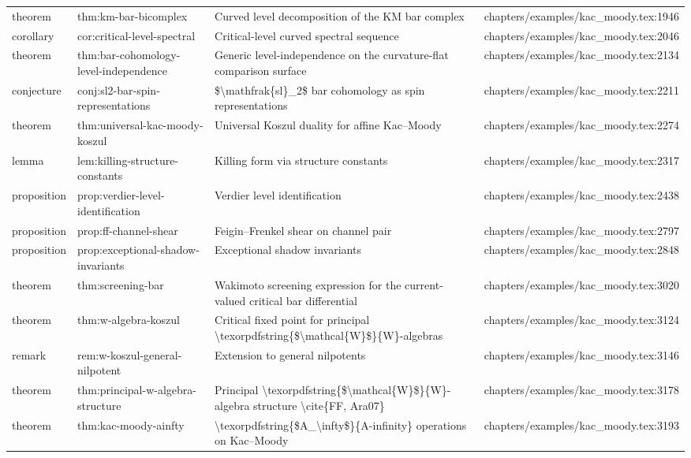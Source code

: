 \documentclass[11pt]{article}
\begin{document}
\begin{longtable}{L{0.10\textwidth}L{0.26\textwidth}L{0.42\textwidth}L{0.22\textwidth}}
theorem & thm:km-bar-bicomplex & Curved level decomposition of the KM bar complex & chapters/examples/kac\_moody.tex:1946\\
corollary & cor:critical-level-spectral & Critical-level curved spectral sequence & chapters/examples/kac\_moody.tex:2046\\
theorem & thm:bar-cohomology-level-independence & Generic level-independence on the curvature-flat comparison surface & chapters/examples/kac\_moody.tex:2134\\
conjecture & conj:sl2-bar-spin-representations & \$\textbackslash{}mathfrak\{sl\}\_2\$ bar cohomology as spin representations & chapters/examples/kac\_moody.tex:2211\\
theorem & thm:universal-kac-moody-koszul & Universal Koszul duality for affine Kac--Moody & chapters/examples/kac\_moody.tex:2274\\
lemma & lem:killing-structure-constants & Killing form via structure constants & chapters/examples/kac\_moody.tex:2317\\
proposition & prop:verdier-level-identification & Verdier level identification & chapters/examples/kac\_moody.tex:2438\\
proposition & prop:ff-channel-shear & Feigin--Frenkel shear on channel pair & chapters/examples/kac\_moody.tex:2797\\
proposition & prop:exceptional-shadow-invariants & Exceptional shadow invariants & chapters/examples/kac\_moody.tex:2848\\
theorem & thm:screening-bar & Wakimoto screening expression for the current-valued critical bar differential & chapters/examples/kac\_moody.tex:3020\\
theorem & thm:w-algebra-koszul & Critical fixed point for principal \textbackslash{}texorpdfstring\{\$\textbackslash{}mathcal\{W\}\$\}\{W\}-algebras & chapters/examples/kac\_moody.tex:3124\\
remark & rem:w-koszul-general-nilpotent & Extension to general nilpotents & chapters/examples/kac\_moody.tex:3146\\
theorem & thm:principal-w-algebra-structure & Principal \textbackslash{}texorpdfstring\{\$\textbackslash{}mathcal\{W\}\$\}\{W\}-algebra structure \textbackslash{}cite\{FF, Ara07\} & chapters/examples/kac\_moody.tex:3178\\
theorem & thm:kac-moody-ainfty & \textbackslash{}texorpdfstring\{\$A\_\textbackslash{}infty\$\}\{A-infinity\} operations on Kac--Moody & chapters/examples/kac\_moody.tex:3193\\

\end{longtable}
\end{document}

